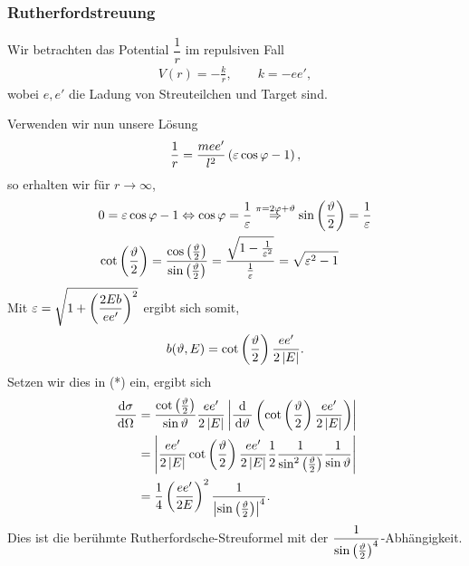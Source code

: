 \subsubsection{Rutherfordstreuung}

Wir betrachten das Potential $\dfrac{1}{r}$ im repulsiven Fall
\begin{align*}
V(r) = -\frac{k}{r},\qquad k = -e e',
\end{align*}
wobei $e,e'$ die Ladung von Streuteilchen und Target sind.

Verwenden wir nun unsere Lösung
\begin{align*}
\frac{1}{r} = \frac{mee'}{l^2}\left(\varepsilon\cos\varphi - 1\right),
\end{align*}
so erhalten wir für $r\to\infty$,
\begin{align*}
&0 = \varepsilon\cos\varphi - 1
\Leftrightarrow \cos \varphi = \frac{1}{\varepsilon}
\overset{\pi = 2\varphi+\vartheta}{\Rightarrow} \sin\left(\frac{\vartheta}{2}\right) =
\frac{1}{\varepsilon}\\
&\cot\left(\frac{\vartheta}{2}\right) =
\frac{\cos\left(\frac{\vartheta}{2}\right)}{\sin\left(\frac{\vartheta}{2}\right)}
= \frac{\sqrt{1-\frac{1}{\varepsilon^2}}}{\frac{1}{\varepsilon}} = \sqrt{\varepsilon^2-1}
\end{align*}
Mit $\varepsilon = \sqrt{1+\left(\dfrac{2Eb}{ee'}\right)^2}$ ergibt sich somit,
\begin{align*}
b(\vartheta,E) = \cot\left(\frac{\vartheta}{2}\right) \frac{ee'}{2\left|E\right|}.
\end{align*}
Setzen wir dies in (*) ein, ergibt sich
\begin{align*}
\frac{\,\mathrm{d} \sigma\,}{\,\mathrm{d} \Omega\,} &= 
\frac{\cot\left(\frac{\vartheta}{2}\right)}{\sin\vartheta}\frac{ee'}{2\left|E\right|} \left|\frac{\mathrm{d}}{\,\mathrm{d} \vartheta\,}
\left(\cot\left(\frac{\vartheta}{2}\right) \frac{ee'}{2\left|E\right|}\right)\right|\\
&=
\left|\frac{ee'}{2\left|E\right|}\cot\left(\frac{\vartheta}{2}\right)\frac{ee'}{2\left|E\right|}
\frac{1}{2}\frac{1}{\sin^2\left(\frac{\vartheta}{2}\right)}\frac{1}{\sin\vartheta}\right|\\
&=
\frac{1}{4}\left(\frac{ee'}{2E}\right)^2\frac{1}{\left|\sin\left(\frac{\vartheta}{2}\right)\right|^4}.
\end{align*}
Dies ist die berühmte Rutherfordsche-Streuformel mit der
$\dfrac{1}{\sin\left(\frac{\vartheta}{2}\right)^4}$-Abhängigkeit.
